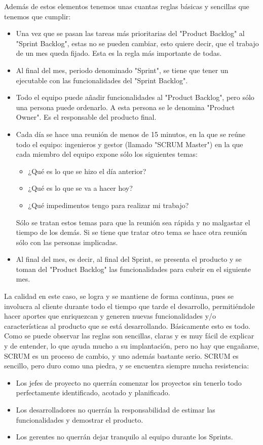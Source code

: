 Además de estos elementos tenemos unas cuantas reglas básicas y sencillas que
tenemos que cumplir:
\begin{itemize}
 \item Una vez que se pasan las tareas más prioritarias del "Product Backlog" al
        "Sprint Backlog", estas no se pueden cambiar, esto quiere decir, que el trabajo
        de un mes queda fijado. Esta es la regla más importante de todas.
 \item Al final del mes, periodo denominado "Sprint", se tiene que tener un ejecutable
        con las funcionalidades del "Sprint Backlog".
 \item Todo el equipo puede añadir funcionalidades al "Product Backlog", pero sólo
        una persona puede ordenarlo. A esta persona se le denomina "Product
        Owner". Es el responsable del producto final.
 \item Cada día se hace una reunión de menos de 15 minutos, en la que se reúne
        todo el equipo: ingenieros y gestor (llamado "SCRUM Master") en la que cada
        miembro del equipo expone sólo los siguientes temas:
	\begin{itemize}
	 \item ¿Qué es lo que se hizo el día anterior?
	 \item ¿Qué es lo que se va a hacer hoy?
	 \item ¿Qué impedimentos tengo para realizar mi trabajo?
	\end{itemize}

        Sólo se tratan estos temas para que la reunión sea rápida y no malgastar el tiempo de los demás. Si se tiene que tratar otro tema se hace otra reunión sólo con las personas implicadas. 
 \item Al final del mes, es decir, al final del Sprint, se presenta el producto y se toman del "Product Backlog" las funcionalidades para cubrir en el siguiente mes.
\end{itemize}

La calidad en este caso, se logra y se mantiene de forma continua, pues se involucra
al cliente durante todo el tiempo que tarde el desarrollo, permitiéndole hacer aportes
que enriquezcan y generen nuevas funcionalidades y/o características al producto que
se está desarrollando.
Básicamente esto es todo.
Como se puede observar las reglas son sencillas, claras y es muy fácil de explicar y de
entender, lo que ayuda mucho a su implantación, pero no hay que engañarse, SCRUM
es un proceso de cambio, y uno además bastante serio.
SCRUM es sencillo, pero duro como una piedra, y se encuentra siempre mucha
resistencia:
\begin{itemize}
 \item Los jefes de proyecto no querrán comenzar los proyectos sin tenerlo todo
        perfectamente identificado, acotado y planificado.
 \item Los desarrolladores no querrán la               responsabilidad    de  estimar   las
        funcionalidades y demostrar el producto.
 \item Los gerentes no querrán dejar tranquilo al equipo durante los Sprints.
\end{itemize}


